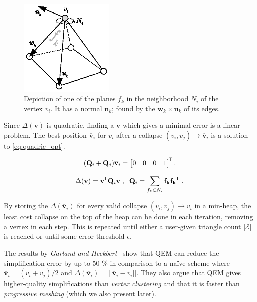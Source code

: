 \begin{figure}[ht]
  \centering
  \includegraphics[width=0.4\textwidth]{figures/quadric_planes.eps}
  \caption{Depiction of one of the planes \(f_k\) in the neighborhood \(N_i\) of the vertex \(v_i\). It has a normal \(\mathbf{n}_k\); found by the \(\mathbf{w}_k \times \mathbf{u}_k\) of its edges.}
  \label{fig:quadrics}
\end{figure}


Since \(\Delta(\mathbf{v})\) is quadratic, finding a \(\mathbf{v}\) which gives a minimal error is a linear problem. The best position \(\mathbf{\overline{v}}_i\) for \(v_i\) after a collapse \((v_i, v_j) \rightarrow \mathbf{\overline{v}}_i\) is a solution to \cref{eq:quadric_opt}.

\begin{equation} \label{eq:quadric_opt}
(\mathbf{Q}_i + \mathbf{Q}_j)\mathbf{\overline{v}}_i = \begin{bmatrix} 0 & 0 & 0 & 1 \end{bmatrix}^{\mkern-1.5mu\mathsf{T}}.
\end{equation}

\begin{equation} \label{eq:homogeneous_quadric}
      \Delta(\mathbf{v}) = \mathbf{v}^{\mkern-1.5mu\mathsf{T}} \mathbf{Q}_i  \mathbf{v} \;,\;\; \mathbf{Q}_i = \sum_{f_k \in N_i}  \mathbf{f_k} \mathbf{f_k}^{\mkern-1.5mu\mathsf{T}} \; .
\end{equation}

By storing the \(\Delta(\mathbf{\overline{v}}_i)\) for every valid collapse \((v_i, v_j) \rightarrow v_i\) in a min-heap, the least cost collapse on the top of the heap can be done in each iteration, removing a vertex in each step. This is repeated until either a user-given triangle count \(|\mathcal{E}|\) is reached or until some error threshold \(\epsilon\).

The results by \emph{Garland and Heckbert}~\cite{garland1997surface} show that QEM can reduce the simplification error by up to 50 \% in comparison to a na\"ive scheme where \(\mathbf{\overline{v}}_i = (v_i + v_j) / 2\) and \(\Delta(\mathbf{\overline{v}}_i) = ||\mathbf{\overline{v}}_i - v_i||\). They also argue that QEM gives higher-quality simplifications than \emph{vertex clustering} and that it is faster than \emph{progressive meshing} (which we also present later).

